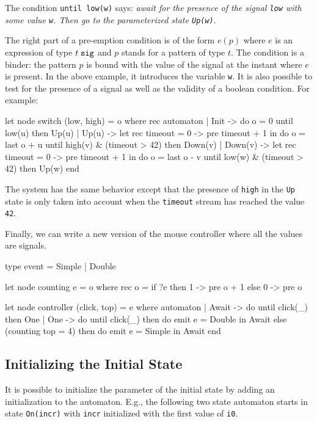 \documentclass[11pt,titlepage,twoside]{report}
\begin{document}
The condition \verb-until low(w)- says: {\em await for the presence of
  the signal \verb-low- with some value \verb-w-. Then go to the
  parameterized state \verb-Up(w)-}.

\newcommand{\Signal}[1]{{#1}\;\mbox{\tt sig}}

The right part of a pre-emption condition is of the form $e(p)$ where
$e$ is an expression of type $\Signal{t}$ and $p$ stands for a pattern
of type $t$. The condition is a binder: the pattern $p$ is bound with
the value of the signal at the instant where $e$ is present.  In the
above example, it introduces the variable \verb-w-. It is also
possible to test for the presence of a signal as well as the validity
of a boolean condition. For example:

\begin{runverbatim}[withresult]
let node switch (low, high) = o where
  rec automaton
  | Init -> do o = 0 until low(u) then Up(u)
  | Up(u) ->
      let rec timeout = 0 -> pre timeout + 1 in
      do o = last o + u
      until high(v) & (timeout > 42) then Down(v)
  | Down(v) ->
      let rec timeout = 0 -> pre timeout + 1 in
      do o = last o - v
      until low(w) & (timeout > 42) then Up(w)
  end
\end{runverbatim}
The system has the same behavior except that the presence of
\verb-high- in the \verb-Up- state is only taken into account when the
\verb-timeout- stream has reached the value \verb-42-.

Finally, we can write a new version of the mouse controller where all
the values are signals.

\begin{runverbatim}[withresult]
type event = Simple | Double

let node counting e = o where
  rec o = if ?e then 1 -> pre o + 1 else 0 -> pre o

let node controller (click, top) = e where
  automaton
  | Await ->
     do until click(_) then One
  | One ->
     do until click(_) then do emit e = Double in Await
     else (counting top = 4) then do emit e = Simple in Await
  end
\end{runverbatim}

\subsection{Initializing the Initial State} %

It is possible to initialize the parameter of the initial state by adding
an initialization to the automaton. E.g., the following two state automaton
starts in state \texttt{On(incr)} with \texttt{incr} initialized with the first
value of \texttt{i0}.
\end{document}
